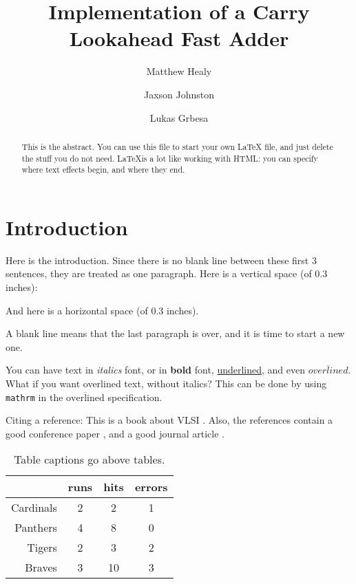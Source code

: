 \documentclass[final]{ieee}
\begin{document}
\title[journal_ex]{Implementation of a Carry Lookahead Fast Adder}
\author[mcw]{
Matthew Healy \\
}
\author[mcw]{
Jaxson Johnston \\
}
\author[mcw]{
Lukas Grbesa \\
}



\maketitle


\begin{abstract}
This is the abstract. You can use this file to start your own LaTeX file,
and just delete the stuff you do not need. \LaTeX  is a lot like working
with HTML: you can specify where text effects begin, and where they end.
\end{abstract}

\section{Introduction}\label{sec:intro}
Here is the introduction.
Since there is no blank line between these first 3 sentences, they are
treated as one paragraph.
Here is a vertical space (of 0.3 inches):
\vspace{.3in}

And here is a \hspace{.3in}horizontal space (of 0.3 inches).

A blank line means that the last paragraph is over, and it is time to start
a new one.

You can have text in {\it italics} font, or in {\bf bold} font,
\underline{underlined}, and even $\overline{overlined}$.
What if you want overlined text, without italics? This can
be done by using \verb"mathrm" in the
$\overline{\mathrm{overlined}}$ specification.

Citing a reference: This is a book about VLSI \cite{Weste93}.
Also, the references contain a good conference paper \cite{LiY88},
and a good journal article \cite{BiS92}.


\begin{table}[!hbt]
\begin{center}
  \caption{Table captions go above tables.}
  \vspace{0.2in}
  \begin{tabular}{|r|c|c|c|}
     \hline
 & runs & hits & errors  \\
     \hline
Cardinals  & 2 & 2 & 1  \\
Panthers & 4 & 8 & 0  \\
Tigers  & 2 & 3 & 2  \\
Braves  & 3 & 10 & 3  \\
     \hline
  \end{tabular}
  \label{tab:example_tab}
\end{center}
\end{table}
\end{document}
